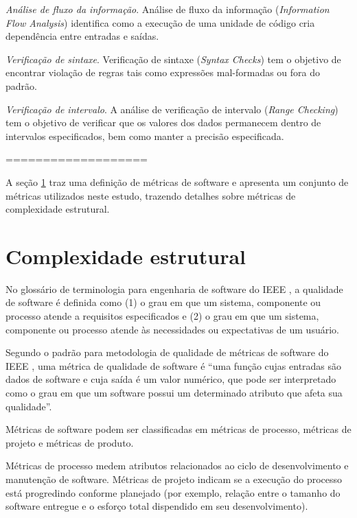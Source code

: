 \begin{description}
  \item \textit{Análise de fluxo da informação}.
    Análise de fluxo da informação ({\it Information Flow Analysis}) identifica
    como a execução de uma unidade de código cria dependência entre entradas e
    saídas.

  \item \textit{Verificação de sintaxe}.
    Verificação de sintaxe ({\it Syntax Checks}) tem o objetivo de encontrar
    violação de regras tais como expressões mal-formadas ou fora do padrão.

  \item \textit{Verificação de intervalo}.
    A análise de verificação de intervalo ({\it Range Checking}) tem o objetivo
    de verificar que os valores dos dados permanecem dentro de intervalos
    especificados, bem como manter a precisão especificada.

\end{description}

===================

A seção \ref{metricas-de-software} traz uma
definição de métricas de software e apresenta um conjunto de métricas
utilizados neste estudo, trazendo detalhes sobre métricas de complexidade
estrutural.

\section{Complexidade estrutural} \label{metricas-de-software}

No glossário de terminologia para engenharia de software do IEEE
\cite{ieee1990ieee}, a qualidade de software é definida como (1) o grau em que
um sistema, componente ou processo atende a requisitos especificados e (2) o
grau em que um sistema, componente ou processo atende às necessidades ou
expectativas de um usuário. 

Segundo o padrão para metodologia de qualidade de métricas de software do IEEE
\cite{software1998ieee}, uma métrica de qualidade de software é ``uma função
cujas entradas são dados de software e cuja saída é um valor numérico, que
pode ser interpretado como o grau em que um software possui um determinado
atributo que afeta sua qualidade''.

Métricas de software podem ser classificadas em métricas de processo, métricas
de projeto e métricas de produto.

Métricas de processo medem atributos relacionados ao ciclo de desenvolvimento
e manutenção de software. Métricas de projeto indicam se a execução do
processo está progredindo conforme planejado (por exemplo, relação entre o
tamanho do software entregue e o esforço total dispendido em seu
desenvolvimento).

